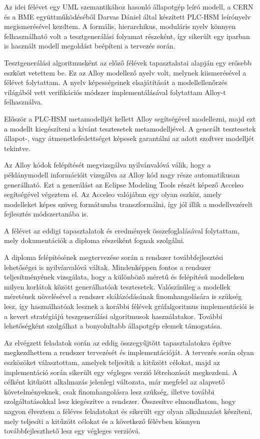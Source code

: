 \documentclass{article}
\begin{document}
Az idei félévet egy UML szemantikához hasonló állapotgép leíró modell, a CERN és a BME együttműködéséből Darvas Dániel által készített PLC-HSM leírónyelv megismerésével kezdtem. A formális, hierarchikus, moduláris nyelv könnyen felhasználható volt a tesztgenerálási folyamat részeként, így sikerült egy iparban is használt modell megoldást beépíteni a tervezés során.

Tesztgenerálási algoritmusként az előző félévek tapasztalatai alapján egy erősebb eszközt vetettem be. Ez az Alloy modellező nyelv volt, melynek kiismerésével a félévet folytattam. A nyelv képességeinek elsajátítását a modellellenőrzés világából vett verifikációs módszer implementálásával folytattam Alloy-t felhasználva.

Először a PLC-HSM metamodelljét kellett Alloy segítségével modellezni, majd ezt a modellt kiegészíteni a kívánt tesztesetek metamodelljével. A generált tesztesetek állapot-, vagy átmenetlefedettséget képesek garantálni az adott szoftver modelljét tekintve.

Az Alloy kódok felépítését megvizsgálva nyilvánvalóvá válik, hogy a példánymodell információit vizsgálva az Alloy kód nagy része automatikusan generálható. Ezt a generálást az Eclipse Modeling Tools részét képező Acceleo segítségével végeztem el. Az Acceleo valójában egy olyan eszköz, amely modelleket képes szöveg formátumba transzformálni, így jól illik a modellvezérelt fejlesztés módszertanába is.

A félévet az eddigi tapasztalatok és eredmények összefoglalásával folytattam, mely dokumentációk a diploma részeiként fognak szolgálni.

A diploma felépítésének megtervezése során a rendszer továbbfejlesztési lehetőségei is nyilvánvalóvá váltak. Mindenképpen fontos a rendszer teljesítményének vizsgálata, hogy a különböző méretű és felépítésű modelleken milyen korlátok között generálhatóak tesztesetek. Valószínűleg a modellek méretének növelésével a rendszer skálázódásának finomhangolására is szükség lesz, így használhatóak lesznek a korábbi félévek gráfalgoritmus implementációi is a kevert stratégiájú teszgenerálási algoritmusok használatakor. További lehetőségként szolgálhat a bonyolultabb állapotgép elemek támogatása.

Az elvégzett feladatok során az eddig összegyűjtött tapasztalatokra építve megkezdhettem a rendszer tervezését és implementációját. A tervezés során olyan eszközöket választottam, amelyek teljesítik a kitűzött célokat, majd az implementáció során sikerült egy végleges verzió létrehozását megkezdeni. A célként kitűzött alkalmazás jelenlegi változata, már megfelel az alapvető követelményeknek, csak finomhangolásra lesz szükség, illetve további szolgáltatásokkal lesz kiegészítve a rendszer. Összesítve elmondhatom, hogy nagyon élveztem a féléves feladatokat és sikerült egy olyan alkalmazást készíteni, mely teljesíti a kitűzött célokat és a következő félévben könnyen továbbfejleszthető lesz egy végleges verzióvá.
\end{document}
